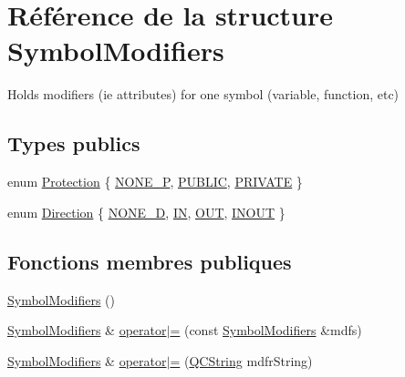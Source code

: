 \hypertarget{struct_symbol_modifiers}{}\section{Référence de la structure Symbol\+Modifiers}
\label{struct_symbol_modifiers}


Holds modifiers (ie attributes) for one symbol (variable, function, etc)  


\subsection*{Types publics}
\begin{DoxyCompactItemize}
\item 
enum \hyperlink{struct_symbol_modifiers_a6c76745fa39de2b90353729fe62c6708}{Protection} \{ \hyperlink{struct_symbol_modifiers_a6c76745fa39de2b90353729fe62c6708ae43158532fe3de25bbe6661d6fdef5d0}{N\+O\+N\+E\+\_\+\+P}, 
\hyperlink{struct_symbol_modifiers_a6c76745fa39de2b90353729fe62c6708ae0d7c512c0fe421f9d64e801771f9fb3}{P\+U\+B\+L\+I\+C}, 
\hyperlink{struct_symbol_modifiers_a6c76745fa39de2b90353729fe62c6708a3af5ff26f32ecc18b95bd75082789867}{P\+R\+I\+V\+A\+T\+E}
 \}
\item 
enum \hyperlink{struct_symbol_modifiers_aceec8152eeb6c06b8dbe03ef14fed6a4}{Direction} \{ \hyperlink{struct_symbol_modifiers_aceec8152eeb6c06b8dbe03ef14fed6a4ace26f25fe9aa85a4d1b93a09af862d8b}{N\+O\+N\+E\+\_\+\+D}, 
\hyperlink{struct_symbol_modifiers_aceec8152eeb6c06b8dbe03ef14fed6a4a61e9eb5a7ae3678a1c6254b69617f4b7}{I\+N}, 
\hyperlink{struct_symbol_modifiers_aceec8152eeb6c06b8dbe03ef14fed6a4a0238d370b0f2d73432f8021cd1c1aed1}{O\+U\+T}, 
\hyperlink{struct_symbol_modifiers_aceec8152eeb6c06b8dbe03ef14fed6a4a3274f871e28c11b61c8256d20296aa27}{I\+N\+O\+U\+T}
 \}
\end{DoxyCompactItemize}
\subsection*{Fonctions membres publiques}
\begin{DoxyCompactItemize}
\item 
\hyperlink{struct_symbol_modifiers_a49316e7efc80b5ea90df2ad2941359f8}{Symbol\+Modifiers} ()
\item 
\hyperlink{struct_symbol_modifiers}{Symbol\+Modifiers} \& \hyperlink{struct_symbol_modifiers_a73f1b078fd79fffd3a50ca217b580bed}{operator$\vert$=} (const \hyperlink{struct_symbol_modifiers}{Symbol\+Modifiers} \&mdfs)
\item 
\hyperlink{struct_symbol_modifiers}{Symbol\+Modifiers} \& \hyperlink{struct_symbol_modifiers_aaca9d411d0392efd25510ca3209178d0}{operator$\vert$=} (\hyperlink{class_q_c_string}{Q\+C\+String} mdfr\+String)
\end{DoxyCompactItemize}
